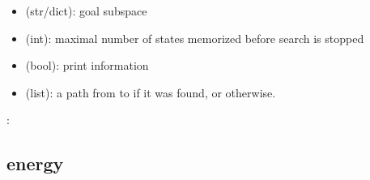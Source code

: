 \documentclass[letterpaper,10pt,english]{sphinxmanual}
\begin{document}
\begin{fulllineitems}
\begin{description}
\begin{itemize}
\item {} 
 (str/dict): goal subspace

\item {} 
 (int): maximal number of states memorized before search is stopped

\item {} 
 (bool): print information

\end{itemize}

\item[{\sphinxstylestrong{returns}:}] \leavevmode\begin{itemize}
\item {} 
 (list): a path from  to  if it was found, or  otherwise.

\end{itemize}

\end{description}

:

\begin{sphinxVerbatim}[commandchars=\\\{\}]
  
  
    
  
\end{sphinxVerbatim}

\end{fulllineitems}



\subsection{energy}
\label{\detokenize{StateTransitionGraphs:energy}}\label{\detokenize{StateTransitionGraphs:id8}}
\end{document}
